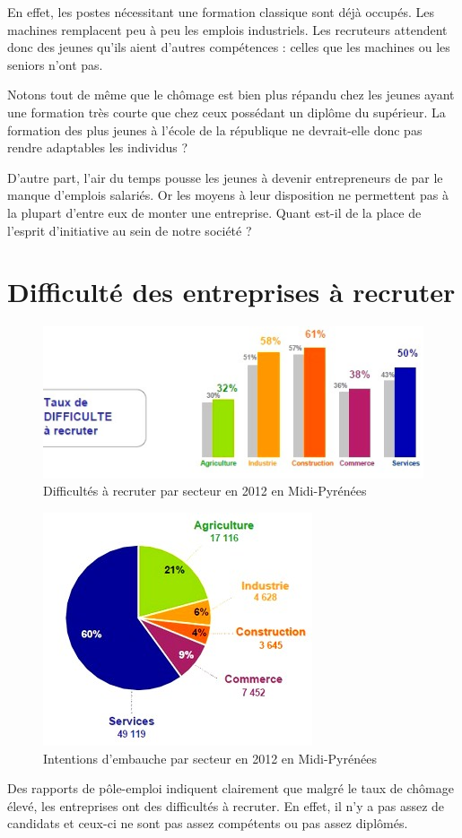En effet, les postes nécessitant une formation \og{}classique\fg{} sont déjà occupés. Les machines remplacent peu à peu les emplois industriels. Les recruteurs attendent donc des jeunes qu'ils aient d'autres compétences : celles que les machines ou les seniors n'ont pas.

Notons tout de même que le chômage est bien plus répandu chez les jeunes ayant une formation très courte que chez ceux possédant un diplôme du supérieur. La formation des plus jeunes à l'école de la république ne devrait-elle donc pas rendre adaptables les individus ?

D'autre part, l'air du temps pousse les jeunes à devenir entrepreneurs de par le manque d'emplois salariés. Or les moyens à leur disposition ne permettent pas à la plupart d'entre eux de monter une entreprise. Quant est-il de la place de l'esprit d'initiative au sein de notre société ?


\section{Difficulté des entreprises à recruter}
\begin{figure}[p]
\centering
\includegraphics[trim=7cm 0cm 0cm 0cm, clip=true, scale=1]{../resources/illustrations/diff_recrut}
\caption{Difficultés à recruter par secteur en 2012 en Midi-Pyrénées \cite{recrutement_midi_pyr}}
\label{diff_recrut}
\end{figure}
\begin{figure}[p]
\centering
\includegraphics[scale=0.8]{../resources/illustrations/embauches}
\caption{Intentions d'embauche par secteur en 2012 en Midi-Pyrénées \cite{recrutement_midi_pyr}}
\label{embauche}
\end{figure}
Des rapports de pôle-emploi indiquent clairement que malgré le taux de chômage élevé, les entreprises ont des difficultés à recruter. En effet, il n'y a pas assez de candidats et ceux-ci ne sont pas assez compétents ou pas assez diplômés. 

